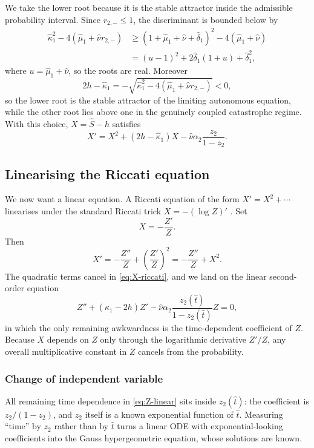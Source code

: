 We take the lower root because it is the stable attractor inside the admissible probability interval. Since $r_{2,-}\leq1$, the discriminant is bounded below by
\begin{align*}
\hat\kappa_1^2-4(\hat\mu_1+\hat\nu r_{2,-})
&\geq(1+\hat\mu_1+\hat\nu+\hat\delta_1)^2
-4(\hat\mu_1+\hat\nu)\\
&=(u-1)^2+2\hat\delta_1(1+u)+\hat\delta_1^2,
\end{align*}
where $u=\hat\mu_1+\hat\nu$, so the roots are real. Moreover
\[
2h-\hat\kappa_1
=-\sqrt{\hat\kappa_1^2-4(\hat\mu_1+\hat\nu r_{2,-})}<0,
\]
so the lower root is the stable attractor of the limiting autonomous equation, while the other root lies above one in the genuinely coupled catastrophe regime. With this choice, $X=\widehat S-h$ satisfies
\begin{equation}
\label{eq:X-riccati}
X'=X^2+(2h-\hat\kappa_1)X
-\hat\nu\alpha_2\frac{z_2}{1-z_2}.
\end{equation}

\subsection{Linearising the Riccati equation}
\label{sec:linearising}

We now want a linear equation. A Riccati equation of the form $X'=X^2+\cdots$ linearises under the standard Riccati trick $X=-(\log Z)'$ \cite{BenderOrszag1978}. Set
\begin{equation}
\label{eq:riccati-substitution}
X=-\frac{Z'}{Z}.
\end{equation}
Then
\[
X'=-\frac{Z''}{Z}+\left(\frac{Z'}{Z}\right)^2
=-\frac{Z''}{Z}+X^2.
\]
The quadratic terms cancel in \cref{eq:X-riccati}, and we land on the linear second-order equation
\begin{equation}
\label{eq:Z-linear}
Z''+(\hat\kappa_1-2h)Z'
-\hat\nu\alpha_2\frac{z_2(\hat t)}{1-z_2(\hat t)}Z=0,
\end{equation}
in which the only remaining awkwardness is the time-dependent coefficient of $Z$. Because $X$ depends on $Z$ only through the logarithmic derivative $Z'/Z$, any overall multiplicative constant in $Z$ cancels from the probability.

\subsubsection{Change of independent variable}

All remaining time dependence in \cref{eq:Z-linear} sits inside $z_2(\hat t)$: the coefficient is $z_2/(1-z_2)$, and $z_2$ itself is a known exponential function of $\hat t$. Measuring ``time'' by $z_2$ rather than by $\hat t$ turns a linear ODE with exponential-looking coefficients into the Gauss hypergeometric equation, whose solutions are known.

